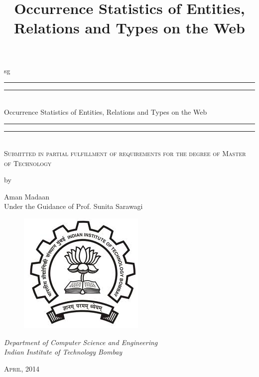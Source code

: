 \documentclass[a4paper,10pt]{article}
\title{Occurrence Statistics of Entities, Relations and Types on the Web} %
\begin{document}
 
sg

\begin{titlepage}
    \centering
    \vspace*{\baselineskip}
    \rule{\textwidth}{1.6pt}\vspace*{-\baselineskip}\vspace*{2pt}
    \rule{\textwidth}{0.4pt}\\[\baselineskip]
    {\LARGE \color{blue} Occurrence Statistics of Entities, Relations and Types on the Web}\\[0.2\baselineskip]
    \rule{ \textwidth}{0.4pt}\vspace*{-\baselineskip}\vspace{3.2pt}
    \rule{\textwidth}{1.6pt}\\[\baselineskip]
    \scshape
    Submitted in partial fulfillment of requirements for the degree of
    Master of Technology \par
    \vspace*{1\baselineskip}
     by \\[\baselineskip]
    {\Large  Aman Madaan \vspace*{1\baselineskip} \\ Under the Guidance of Prof. Sunita Sarawagi\par}
       \begin{figure}[h]
 \centering
 \vspace*{13\baselineskip}
 \includegraphics[bb=0 0 229 220,scale=0.35]{./iitb_logo.jpg}
\end{figure}

    {\vspace*{1\baselineskip}  \itshape Department of Computer Science and Engineering \\ Indian Institute of Technology Bombay\par}
    \vfill
 
    {\scshape April, 2014} \\
    {\large }\par
  \end{titlepage}
\newpage
\maketitle
\end{document}

